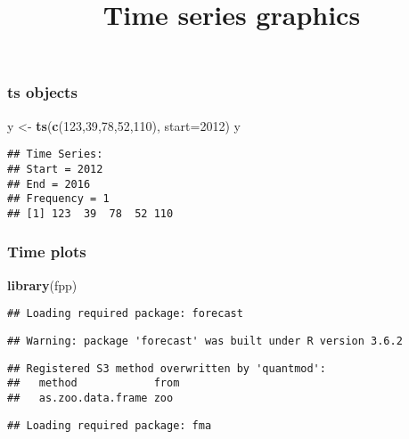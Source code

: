 \documentclass[]{article}
\title{Time series graphics}
\author{}
\date{\vspace{-2.5em}}
\newenvironment{Shaded}{\begin{snugshade}}{\end{snugshade}}
\newcommand{\DataTypeTok}[1]{\textcolor[rgb]{0.13,0.29,0.53}{#1}}
\newcommand{\DecValTok}[1]{\textcolor[rgb]{0.00,0.00,0.81}{#1}}
\newcommand{\KeywordTok}[1]{\textcolor[rgb]{0.13,0.29,0.53}{\textbf{#1}}}
\newcommand{\NormalTok}[1]{#1}
\newcommand{\StringTok}[1]{\textcolor[rgb]{0.31,0.60,0.02}{#1}}
\begin{document}
\maketitle

\hypertarget{ts-objects}{%
\subsubsection{ts objects}\label{ts-objects}}

\begin{Shaded}
\begin{Highlighting}[]
\NormalTok{y <-}\StringTok{ }\KeywordTok{ts}\NormalTok{(}\KeywordTok{c}\NormalTok{(}\DecValTok{123}\NormalTok{,}\DecValTok{39}\NormalTok{,}\DecValTok{78}\NormalTok{,}\DecValTok{52}\NormalTok{,}\DecValTok{110}\NormalTok{), }\DataTypeTok{start=}\DecValTok{2012}\NormalTok{)}
\NormalTok{y}
\end{Highlighting}
\end{Shaded}

\begin{verbatim}
## Time Series:
## Start = 2012 
## End = 2016 
## Frequency = 1 
## [1] 123  39  78  52 110
\end{verbatim}

\hypertarget{time-plots}{%
\subsubsection{Time plots}\label{time-plots}}

\begin{Shaded}
\begin{Highlighting}[]
\KeywordTok{library}\NormalTok{(fpp)}
\end{Highlighting}
\end{Shaded}

\begin{verbatim}
## Loading required package: forecast
\end{verbatim}

\begin{verbatim}
## Warning: package 'forecast' was built under R version 3.6.2
\end{verbatim}

\begin{verbatim}
## Registered S3 method overwritten by 'quantmod':
##   method            from
##   as.zoo.data.frame zoo
\end{verbatim}

\begin{verbatim}
## Loading required package: fma
\end{verbatim}
\end{document}
